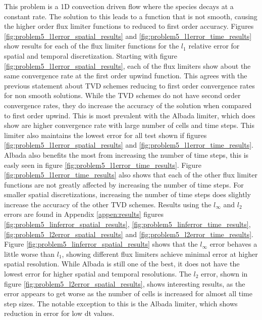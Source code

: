 This problem is a 1D convection driven flow where the species decays at a constant rate. The solution to this leads to a function that is not smooth, causing the higher order flux limiter functions to reduced to first order accuracy. Figures \ref{fig:problem5_l1error_spatial_results} and \ref{fig:problem5_l1error_time_results} show results for each of the flux limiter functions for the $l_{1}$ relative error for spatial and temporal discretization. Starting with figure \ref{fig:problem5_l1error_spatial_results}, each of the flux limiters show about the same convergence rate at the first order upwind function. This agrees with the previous statement about TVD schemes reducing to first order convergence rates for non smooth solutions. While the TVD schemes do not have second order convergence rates, they do increase the accuracy of the solution when compared to first order upwind. This is most prevalent with the Albada limiter, which does show are higher convergence rate with large number of cells and time steps. This limiter also maintains the lowest error for all test shown if figures \ref{fig:problem5_l1error_spatial_results} and \ref{fig:problem5_l1error_time_results}. Albada also benefits the most from increasing the number of time steps, this is easly seen in figure \ref{fig:problem5_l1error_time_results}. Figure \ref{fig:problem5_l1error_time_results} also shows that each of the other flux limiter functions are not greatly affected by increasing the number of time steps. For smaller spatial discretizations, increasing the number of time steps does slightly increase the accuracy of the other TVD schemes. Results using the $l_{\infty}$ and $l_{2}$ errors are found in Appendix \ref{appen:results} figures \ref{fig:problem5_linferror_spatial_results}, \ref{fig:problem5_linferror_time_results}, \ref{fig:problem5_l2error_spatial_results} and \ref{fig:problem5_l2error_time_results}. Figure \ref{fig:problem5_linferror_spatial_results} shows that the $l_{\infty}$ error behaves a little worse than $l_{1}$, showing different flux limiters achieve minimal error at higher spatial resolution. While Albada is still one of the best, it does not have the lowest error for higher spatial and temporal resolutions. The $l_{2}$ error, shown in figure \ref{fig:problem5_l2error_spatial_results}, shows interesting results, as the error appears to get worse as the number of cells is increased for almost all time step sizes. The notable exception to this is the Albada limiter, which shows reduction in error for low dt values. 

